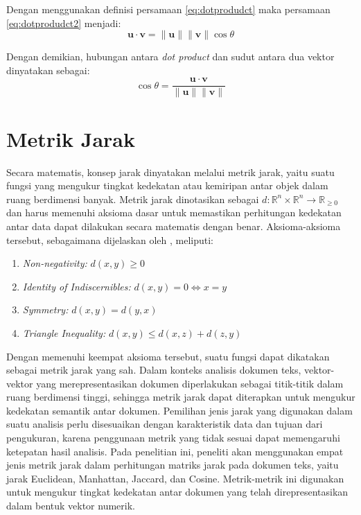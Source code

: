 \documentclass[a4paper,12pt]{report}
\numberwithin{equation}{chapter}
\begin{document}
Dengan menggunakan definisi persamaan \ref{eq:dotprodudct} maka persamaan \ref{eq:dotprodudct2} menjadi:
\begin{equation}
\mathbf{u} \cdot \mathbf{v} = \| \mathbf{u} \| \| \mathbf{v} \| \cos \theta
\end{equation}

Dengan demikian, hubungan antara \textit{dot product} dan sudut antara dua vektor dinyatakan sebagai:
\begin{equation}
\cos \theta = \frac{\mathbf{u} \cdot \mathbf{v}}{\| \mathbf{u} \| \| \mathbf{v} \|}
\end{equation}


\section{Metrik Jarak}
\label{sec:Representasi}
Secara matematis, konsep jarak dinyatakan melalui metrik jarak, yaitu suatu fungsi yang mengukur tingkat kedekatan atau kemiripan antar objek dalam ruang berdimensi banyak. Metrik jarak dinotasikan sebagai $d : \mathbb{R}^n \times \mathbb{R}^n \to \mathbb{R}_{\geq 0}$ dan harus memenuhi aksioma dasar untuk memastikan perhitungan kedekatan antar data dapat dilakukan secara matematis dengan benar. Aksioma-aksioma tersebut, sebagaimana dijelaskan oleh \citep{book:925150}, meliputi:
\begin{enumerate}
    \item \textit{Non-negativity:} \( d(x, y) \geq 0 \)
    \item \textit{Identity of Indiscernibles:} \( d(x, y) = 0 \iff x = y \)
    \item \textit{Symmetry:} \( d(x, y) = d(y, x) \)
    \item \textit{Triangle Inequality:} \( d(x, y) \leq d(x, z) + d(z, y) \)
\end{enumerate}

Dengan memenuhi keempat aksioma tersebut, suatu fungsi dapat dikatakan sebagai metrik jarak yang sah. Dalam konteks analisis dokumen teks, vektor-vektor yang merepresentasikan dokumen diperlakukan sebagai titik-titik dalam ruang berdimensi tinggi, sehingga metrik jarak dapat diterapkan untuk mengukur kedekatan semantik antar dokumen. Pemilihan jenis jarak yang digunakan dalam suatu analisis perlu disesuaikan dengan karakteristik data dan tujuan dari pengukuran, karena penggunaan metrik yang tidak sesuai dapat memengaruhi ketepatan hasil analisis. Pada penelitian ini, peneliti akan menggunakan empat jenis metrik jarak dalam perhitungan matriks jarak pada dokumen teks, yaitu jarak Euclidean, Manhattan, Jaccard, dan Cosine. Metrik-metrik ini digunakan untuk mengukur tingkat kedekatan antar dokumen yang telah direpresentasikan dalam bentuk vektor numerik.
\end{document}
